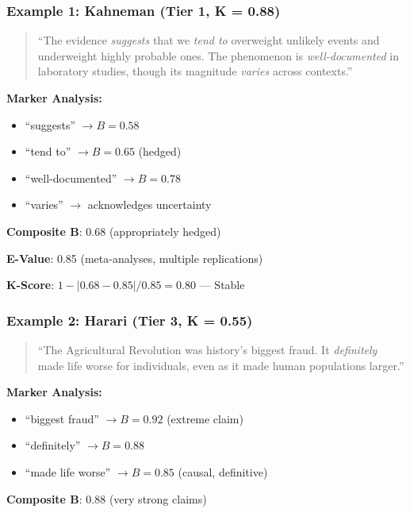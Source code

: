 \documentclass[11pt,a4paper]{article}
\begin{document}
\subsubsection{Example 1: Kahneman (Tier 1, K = 0.88)}

\begin{quote}
``The evidence \textit{suggests} that we \textit{tend to} overweight unlikely events and underweight highly probable ones. The phenomenon is \textit{well-documented} in laboratory studies, though its magnitude \textit{varies} across contexts.''
\end{quote}

\textbf{Marker Analysis:}
\begin{itemize}
    \item ``suggests'' $\to B = 0.58$
    \item ``tend to'' $\to B = 0.65$ (hedged)
    \item ``well-documented'' $\to B = 0.78$
    \item ``varies'' $\to$ acknowledges uncertainty
\end{itemize}

\textbf{Composite B}: 0.68 (appropriately hedged)

\textbf{E-Value}: 0.85 (meta-analyses, multiple replications)

\textbf{K-Score}: $1 - |0.68 - 0.85| / 0.85 = 0.80$ --- \textcolor{green!60!black}{Stable}

\subsubsection{Example 2: Harari (Tier 3, K = 0.55)}

\begin{quote}
``The Agricultural Revolution was history's biggest fraud. It \textit{definitely} made life worse for individuals, even as it made human populations larger.''
\end{quote}

\textbf{Marker Analysis:}
\begin{itemize}
    \item ``biggest fraud'' $\to B = 0.92$ (extreme claim)
    \item ``definitely'' $\to B = 0.88$
    \item ``made life worse'' $\to B = 0.85$ (causal, definitive)
\end{itemize}

\textbf{Composite B}: 0.88 (very strong claims)
\end{document}
